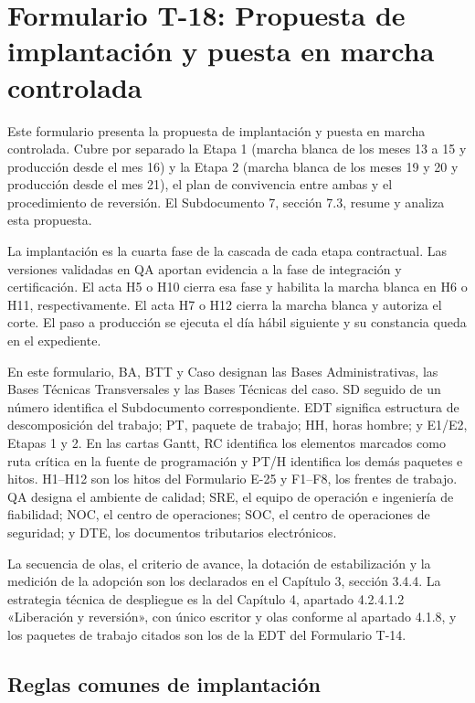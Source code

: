 \chapter*{Formulario T-18: Propuesta de implantación y puesta en marcha controlada}

Este formulario presenta la propuesta de implantación y puesta en marcha controlada. Cubre por separado la Etapa 1 (marcha blanca de los meses 13 a 15 y producción desde el mes 16) y la Etapa 2 (marcha blanca de los meses 19 y 20 y producción desde el mes 21), el plan de convivencia entre ambas y el procedimiento de reversión. El Subdocumento 7, sección 7.3, resume y analiza esta propuesta.

La implantación es la cuarta fase de la cascada de cada etapa contractual. Las versiones validadas en QA aportan evidencia a la fase de integración y certificación. El acta H5 o H10 cierra esa fase y habilita la marcha blanca en H6 o H11, respectivamente. El acta H7 o H12 cierra la marcha blanca y autoriza el corte. El paso a producción se ejecuta el día hábil siguiente y su constancia queda en el expediente.

En este formulario, BA, BTT y Caso designan las Bases Administrativas, las Bases Técnicas Transversales y las Bases Técnicas del caso. SD seguido de un número identifica el Subdocumento correspondiente. EDT significa estructura de descomposición del trabajo; PT, paquete de trabajo; HH, horas hombre; y E1/E2, Etapas 1 y 2. En las cartas Gantt, RC identifica los elementos marcados como ruta crítica en la fuente de programación y PT/H identifica los demás paquetes e hitos. H1–H12 son los hitos del Formulario E-25 y F1–F8, los frentes de trabajo. QA designa el ambiente de calidad; SRE, el equipo de operación e ingeniería de fiabilidad; NOC, el centro de operaciones; SOC, el centro de operaciones de seguridad; y DTE, los documentos tributarios electrónicos.

La secuencia de olas, el criterio de avance, la dotación de estabilización y la medición de la adopción son los declarados en el Capítulo 3, sección 3.4.4. La estrategia técnica de despliegue es la del Capítulo 4, apartado 4.2.4.1.2 «Liberación y reversión», con único escritor y olas conforme al apartado 4.1.8, y los paquetes de trabajo citados son los de la EDT del Formulario T-14.

\section{Reglas comunes de implantación}

